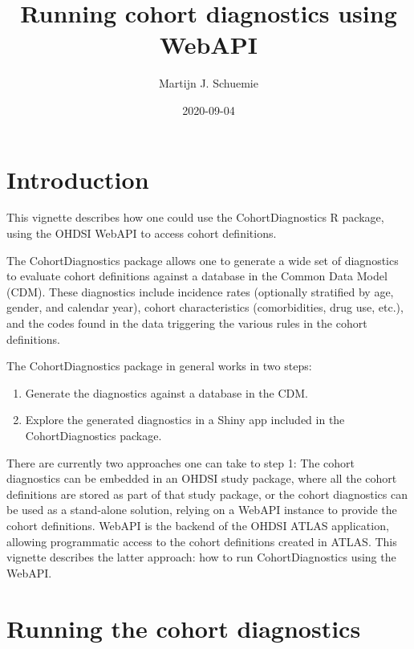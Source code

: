 \documentclass[
]{article}
\title{Running cohort diagnostics using WebAPI}
\author{Martijn J. Schuemie}
\date{2020-09-04}
\providecommand{\tightlist}{%
  \setlength{\itemsep}{0pt}\setlength{\parskip}{0pt}}
\begin{document}
\maketitle

{
\setcounter{tocdepth}{2}
\tableofcontents
}
\hypertarget{introduction}{%
\section{Introduction}\label{introduction}}

This vignette describes how one could use the CohortDiagnostics R
package, using the OHDSI WebAPI to access cohort definitions.

The CohortDiagnostics package allows one to generate a wide set of
diagnostics to evaluate cohort definitions against a database in the
Common Data Model (CDM). These diagnostics include incidence rates
(optionally stratified by age, gender, and calendar year), cohort
characteristics (comorbidities, drug use, etc.), and the codes found in
the data triggering the various rules in the cohort definitions.

The CohortDiagnostics package in general works in two steps:

\begin{enumerate}
\def\labelenumi{\arabic{enumi}.}
\tightlist
\item
  Generate the diagnostics against a database in the CDM.
\item
  Explore the generated diagnostics in a Shiny app included in the
  CohortDiagnostics package.
\end{enumerate}

There are currently two approaches one can take to step 1: The cohort
diagnostics can be embedded in an OHDSI study package, where all the
cohort definitions are stored as part of that study package, or the
cohort diagnostics can be used as a stand-alone solution, relying on a
WebAPI instance to provide the cohort definitions. WebAPI is the backend
of the OHDSI ATLAS application, allowing programmatic access to the
cohort definitions created in ATLAS. This vignette describes the latter
approach: how to run CohortDiagnostics using the WebAPI.

\hypertarget{running-the-cohort-diagnostics}{%
\section{Running the cohort
diagnostics}\label{running-the-cohort-diagnostics}}
\end{document}
